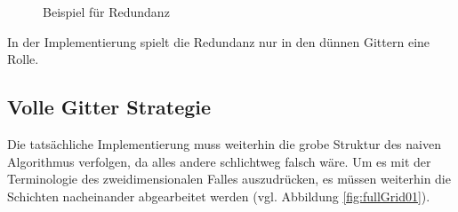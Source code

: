 \documentclass[a4paper,12pt]{llncs}
\numberwithin{equation}{section}
\begin{document}
\begin{figure}
	\centering
	\resizebox{.90\linewidth}{!}{}
	\caption{Beispiel für Redundanz}
	\label{fig:redundancy}
\end{figure}

In der Implementierung spielt die Redundanz nur in den dünnen Gittern eine Rolle.


\subsection{Volle Gitter Strategie}

Die tatsächliche Implementierung muss weiterhin die grobe Struktur des naiven Algorithmus verfolgen, da alles andere schlichtweg falsch wäre. Um es mit der Terminologie des zweidimensionalen Falles auszudrücken, es müssen weiterhin die Schichten nacheinander abgearbeitet werden (vgl. Abbildung \ref{fig:fullGrid01}).
\end{document}
